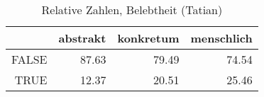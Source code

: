 \begin{table}[ht]
\centering
\begin{tabular}{rrrr}
  \hline
 & abstrakt & konkretum & menschlich \\ 
  \hline
FALSE & 87.63 & 79.49 & 74.54 \\ 
  TRUE & 12.37 & 20.51 & 25.46 \\ 
   \hline
\end{tabular}
\caption{Relative Zahlen, Belebtheit  (Tatian)} 
\end{table}
